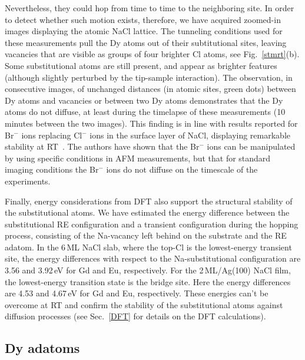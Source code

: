 Nevertheless, they could hop from time to time to the neighboring site. In order to detect whether such motion exists, therefore, we have acquired zoomed-in images displaying the atomic NaCl lattice. The tunneling conditions used for these measurements pull the Dy atoms  out of their subtitutional sites, leaving vacancies that are visible as groups of four brighter Cl atoms, see Fig.~\ref{stmrt}(b). Some substitutional atoms are still present, and appear as brighter features (although slightly perturbed by the tip-sample interaction). The observation, in consecutive images, of unchanged distances (in atomic sites, green dots) between Dy atoms and vacancies or between two Dy atoms demonstrates that the Dy atoms do not diffuse, at least during the timelapse of these measurements (10 minutes between the two images).
This finding is in line with results reported for Br$^-$ ions replacing Cl$^-$ ions in the surface layer of NaCl, displaying remarkable stability at RT~\cite{kaw14}. The authors have shown that the Br$^-$  ions can be manipulated by using specific conditions in AFM measurements, but that for standard imaging conditions the Br$^-$ ions do not diffuse on the timescale of the experiments.

Finally, energy considerations from DFT also support the structural stability of the substitutional atoms. We have estimated the energy difference between the substitutional RE configuration and a transient configuration during the hopping process, consisting of the Na-vacancy left behind on the substrate and the RE adatom. In the 6\,ML NaCl slab, where the top-Cl is the lowest-energy transient site, the energy differences with respect to the Na-substitutional configuration are 3.56 and 3.92\,eV for Gd and Eu, respectively. For the 2\,ML/Ag(100) NaCl film, the lowest-energy transition state is the bridge site. Here the energy differences are 4.53 and 4.67\,eV for Gd and Eu, respectively. These energies can't be overcome at RT and confirm the stability of the substitutional atoms against diffusion processes (see Sec.~\ref{DFT} for details on the DFT calculations).






\subsection{Dy adatoms}

